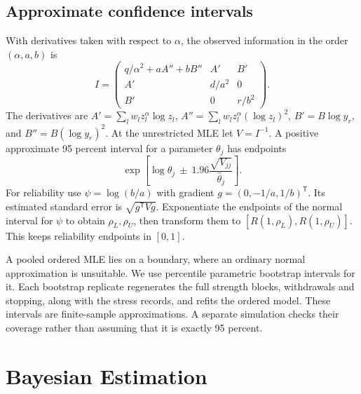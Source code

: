 \documentclass[a4paper,11pt]{article}
\begin{document}
\subsection{Approximate confidence intervals}\label{sec:aci}
With derivatives taken with respect to $\alpha$, the observed information in the order $(\alpha,a,b)$ is
\begin{equation}
I=\begin{pmatrix}
q/\alpha^2+aA''+bB''&A'&B'\\
A'&d/a^2&0\\
B'&0&r/b^2
\end{pmatrix}.\label{eq:information}
\end{equation}
The derivatives are $A'=\sum_lw_lz_l^\alpha\log z_l$, $A''=\sum_lw_lz_l^\alpha(\log z_l)^2$, $B'=B\log y_r$, and $B''=B(\log y_r)^2$. At the unrestricted MLE let $V=I^{-1}$. A positive approximate 95 percent interval for a parameter $\theta_j$ has endpoints
\begin{equation}
\exp\left[\log\widehat\theta_j\ \pm\ 1.96\frac{\sqrt{V_{jj}}}{\widehat\theta_j}\right].\label{eq:parameter-aci}
\end{equation}
For reliability use $\psi=\log(b/a)$ with gradient $g=(0,-1/a,1/b)^{\mathsf T}$. Its estimated standard error is $\sqrt{g^{\mathsf T}Vg}$. Exponentiate the endpoints of the normal interval for $\psi$ to obtain $\rho_L,\rho_U$, then transform them to $[R(1,\rho_L),R(1,\rho_U)]$. This keeps reliability endpoints in $[0,1]$.

A pooled ordered MLE lies on a boundary, where an ordinary normal approximation is unsuitable. We use percentile parametric bootstrap intervals for it. Each bootstrap replicate regenerates the full strength blocks, withdrawals and stopping, along with the stress records, and refits the ordered model. These intervals are finite-sample approximations. A separate simulation checks their coverage rather than assuming that it is exactly 95 percent.

\section{Bayesian Estimation}\label{sec:bayes}
\end{document}

